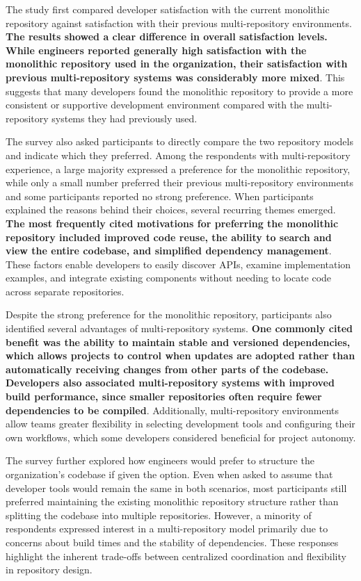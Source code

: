 The study first compared developer satisfaction with the current monolithic repository against satisfaction with their previous multi-repository environments. \textbf{The results showed a clear difference in overall satisfaction levels. While engineers reported generally high satisfaction with the monolithic repository used in the organization, their satisfaction with previous multi-repository systems was considerably more mixed}. This suggests that many developers found the monolithic repository to provide a more consistent or supportive development environment compared with the multi-repository systems they had previously used.

The survey also asked participants to directly compare the two repository models and indicate which they preferred. Among the respondents with multi-repository experience, a large majority expressed a preference for the monolithic repository, while only a small number preferred their previous multi-repository environments and some participants reported no strong preference. When participants explained the reasons behind their choices, several recurring themes emerged. \textbf{The most frequently cited motivations for preferring the monolithic repository included improved code reuse, the ability to search and view the entire codebase, and simplified dependency management}. These factors enable developers to easily discover APIs, examine implementation examples, and integrate existing components without needing to locate code across separate repositories.

Despite the strong preference for the monolithic repository, participants also identified several advantages of multi-repository systems. \textbf{One commonly cited benefit was the ability to maintain stable and versioned dependencies, which allows projects to control when updates are adopted rather than automatically receiving changes from other parts of the codebase. Developers also associated multi-repository systems with improved build performance, since smaller repositories often require fewer dependencies to be compiled}. Additionally, multi-repository environments allow teams greater flexibility in selecting development tools and configuring their own workflows, which some developers considered beneficial for project autonomy.

The survey further explored how engineers would prefer to structure the organization's codebase if given the option. Even when asked to assume that developer tools would remain the same in both scenarios, most participants still preferred maintaining the existing monolithic repository structure rather than splitting the codebase into multiple repositories. However, a minority of respondents expressed interest in a multi-repository model primarily due to concerns about build times and the stability of dependencies. These responses highlight the inherent trade-offs between centralized coordination and flexibility in repository design.

